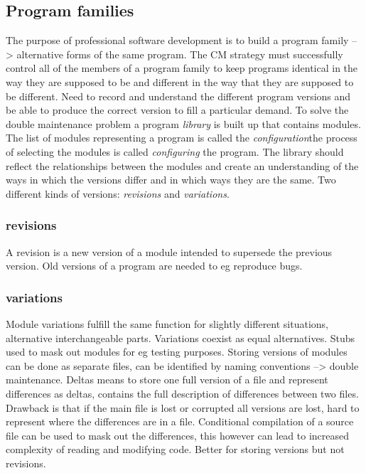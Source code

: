 \documentclass{article}
\begin{document}
\subsection{Program families}
The purpose of professional software development is to build a program family --> alternative forms of the same program. The CM  strategy must successfully control all of the members of a program family to keep programs identical in the way they are supposed to be and different in the way that they are supposed to be different. Need to record and understand the different program versions and be able to produce the correct version to fill a particular demand. To solve the double maintenance problem a program \textit{library} is built up that contains modules. The list of modules representing a program is called the \textit{configuration}the process of selecting the modules is called \textit{configuring} the program.
The library should reflect the relationships between the modules and create an understanding of the ways in which the versions differ and in which ways they are the same. Two different kinds of versions: \textit{revisions} and \textit{variations}.

\subsubsection{revisions}
A revision is a new version of a module intended to supersede the previous version. Old versions of a program are needed to eg reproduce bugs.

\subsubsection{variations}
Module variations fulfill the same function for slightly different situations, alternative interchangeable parts. Variations coexist as equal alternatives. Stubs used to mask out modules for eg testing purposes.
Storing versions of modules can be done as separate files, can be identified by naming conventions --> double maintenance. Deltas means to store one full version of a file and represent differences as deltas, contains the full description of differences between two files. Drawback is that if the main file is lost or corrupted all versions are lost, hard to represent where the differences are in a file.
Conditional compilation of a source file can be used to mask out the differences, this however can lead to increased complexity of reading and modifying code. Better for storing versions but not revisions.
\end{document}

